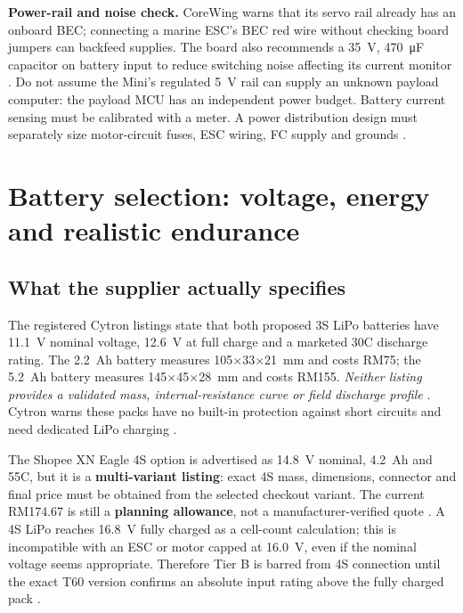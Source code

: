 \textbf{Power-rail and noise check.} CoreWing warns that its servo rail already has an onboard BEC; connecting a marine ESC's BEC red wire without checking board jumpers can backfeed supplies. The board also recommends a 35~V, 470~\si{\micro\farad} capacitor on battery input to reduce switching noise affecting its current monitor \cite{coreDoc}. Do not assume the Mini's regulated 5~V rail can supply an unknown payload computer: the payload MCU has an independent power budget. Battery current sensing must be calibrated with a meter. A power distribution design must separately size motor-circuit fuses, ESC wiring, FC supply and grounds \cite{coreDoc,fuse,wire}.

\section{Battery selection: voltage, energy and realistic endurance}
\label{sec:battery}
\subsection{What the supplier actually specifies}
The registered Cytron listings state that both proposed 3S LiPo batteries have 11.1~V nominal voltage, 12.6~V at full charge and a marketed 30C discharge rating. The 2.2~Ah battery measures 105$\times$33$\times$21~mm and costs RM75; the 5.2~Ah battery measures 145$\times$45$\times$28~mm and costs RM155. \emph{Neither listing provides a validated mass, internal-resistance curve or field discharge profile} \cite{bat22,bat52}. Cytron warns these packs have no built-in protection against short circuits and need dedicated LiPo charging \cite{bat22,bat52}.

The Shopee XN Eagle 4S option is advertised as 14.8~V nominal, 4.2~Ah and 55C, but it is a \textbf{multi-variant listing}: exact 4S mass, dimensions, connector and final price must be obtained from the selected checkout variant. The current RM174.67 is still a \textbf{planning allowance}, not a manufacturer-verified quote \cite{bat4Shopee}. A 4S LiPo reaches 16.8~V fully charged as a cell-count calculation; this is incompatible with an ESC or motor capped at 16.0~V, even if the nominal voltage seems appropriate. Therefore Tier B is barred from 4S connection until the exact T60 version confirms an absolute input rating above the fully charged pack \cite{hobbyShop,hobbyRef}.

